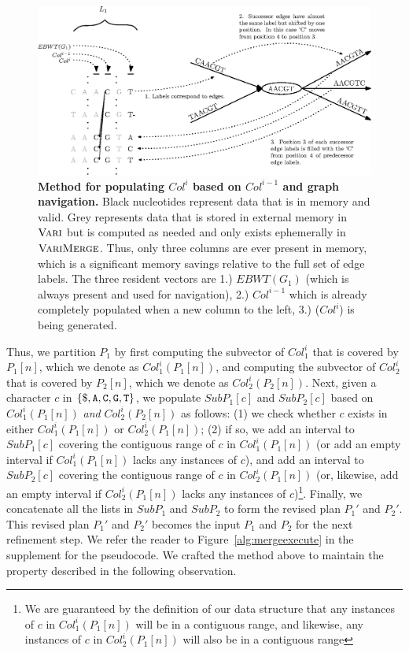 \begin{figure}[h]
	
  \centering
	\includegraphics[width=1.0\textwidth]{varimerge/content/get_col.eps}
  	\caption{{\bf Method for populating $Col^i$ based on $Col^{i-1}$ and graph navigation.} Black nucleotides represent data that is in memory and valid.  Grey represents data that is stored in external memory in $\mbox{\rm {\sc Vari}}$ but is computed as needed and only exists ephemerally in $\mbox{\rm {\sc VariMerge}}$. Thus, only three columns are ever present in memory, which is a significant memory savings relative to the full set of edge labels.  The three resident vectors are 1.) $EBWT(G_1)$ (which is always present and used for navigation), 2.) $Col^{i-1}$ which is already completely populated when a new column to the left, 3.) ($Col^i$) is being generated.}

	\label{figure:get_col}
	
\end{figure}



Thus, we partition $P_1$ by first computing the subvector of $Col_1^i$ that is covered by $P_1[n]$, which we denote as $Col_1^i(P_1[n])$, and computing the subvector of $Col_2^i$ that is covered by $P_2[n]$, which we denote  as $Col_2^i(P_2[n])$.  Next, given a character $c$ in $\{ {\tt \$},  {\tt A}, {\tt C}, {\tt G}, {\tt T} \}$, we populate $SubP_1[c]$ and $SubP_2[c]$ based on $Col_1^i(P_1[n])$ {\em and} $Col_2^i(P_2[n])$ as follows: (1) we check whether $c$ exists in either $Col_1^i(P_1[n])$ or $Col_2^i(P_1[n])$; (2) if so, we add an interval to $SubP_1[c]$ covering the contiguous range of $c$ in  $Col_1^i(P_1[n])$ (or add an empty interval if $Col_1^i(P_1[n])$ lacks any instances of $c$), and add an interval to $SubP_2[c]$ covering the contiguous range of $c$ in  $Col_2^i(P_1[n])$ (or, likewise, add an empty interval if $Col_2^i(P_1[n])$ lacks any instances of $c$)\footnote{We are guaranteed by the definition of our data structure that any instances of $c$ in $Col_1^i(P_1[n])$ will be in a contiguous range, and likewise, any instances of $c$ in $Col_2^i(P_1[n])$ will also be in a contiguous range}.  Finally, we concatenate all the lists in $SubP_1$ and $SubP_2$ to form the revised plan $P_1'$ and $P_2'$. This revised plan $P_1'$ and $P_2'$ becomes the input $P_1$ and $P_2$ for the next refinement step. We refer the reader to Figure~\ref{alg:mergeexecute} in the supplement for the pseudocode. We crafted the method above to maintain the property described in the following observation.


